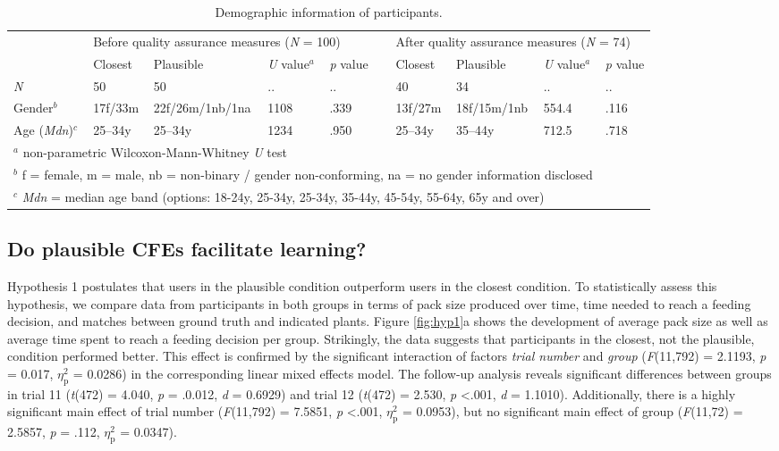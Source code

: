 {\begin{table}
  \caption{Demographic information of participants.}
  \label{tab:participants}
\begin{tabular}{llllllllll} 
\toprule
    & \multicolumn{4}{l}{Before quality assurance measures (\textit{N} = 100)} && \multicolumn{4}{l}{After quality assurance measures (\textit{N} = 74)} \\
\cline{2-5}\cline{7-10}
    & Closest & Plausible & \textit{U} value$^a$ & \textit{p} value && Closest & Plausible & \textit{U} value$^a$ & \textit{p} value\\ 
\hline
\textit{N}   &  50 & 50 & .. & .. && 40 & 34 & .. & .. \\
Gender$^b$ & 17f/33m & 22f/26m/1nb/1na & 1108 & .339 && 13f/27m & 18f/15m/1nb & 554.4 & .116 \\
Age (\textit{Mdn})$^c$ & 25--34y & 25--34y & 1234 & .950 && 25--34y & 35--44y & 712.5 & .718 \\
\bottomrule
\multicolumn{9}{l}{$^a$ non-parametric Wilcoxon-Mann-Whitney \textit{U} test}\\
\multicolumn{9}{l}{$^b$ f = female, m = male, nb = non-binary / gender non-conforming, na = no gender information disclosed}\\
\multicolumn{9}{l}{$^c$ \textit{Mdn} = median age band (options: 18-24y, 25-34y, 25-34y, 35-44y, 45-54y, 55-64y, 65y and over)}
\end{tabular}
\end{table}

\subsection{Do plausible CFEs facilitate learning?}

Hypothesis 1 postulates that users in the plausible condition outperform users in the closest condition.
To statistically assess this hypothesis, we compare data from participants in both groups in terms of pack size produced over time, time needed to reach a feeding decision, and matches between ground truth and indicated plants.
Figure \ref{fig:hyp1}a shows the development of average pack size as well as average time spent to reach a feeding decision per group. 
Strikingly, the data suggests that participants in the closest, not the plausible, condition performed better. 
This effect is confirmed by the significant interaction of factors \textit{trial number} and \textit{group} (\textit{F}(11,792) = 2.1193, \textit{p} = 0.017, $\eta_{\text{p}}^{2}$ = 0.0286) in the corresponding linear mixed effects model. The follow-up analysis reveals significant differences between groups in trial 11 (\textit{t}(472) = 4.040, \textit{p} = .0.012, \textit{d} = 0.6929) and trial 12 (\textit{t}(472) = 2.530, \textit{p} \textless .001, \textit{d} = 1.1010).
Additionally, there is a highly significant main effect of trial number (\textit{F}(11,792) = 7.5851, \textit{p} \textless .001, $\eta_{\text{p}}^{2}$ = 0.0953), but no significant main effect of group (\textit{F}(11,72) = 2.5857, \textit{p} = .112, $\eta_{\text{p}}^{2}$ = 0.0347).

}
